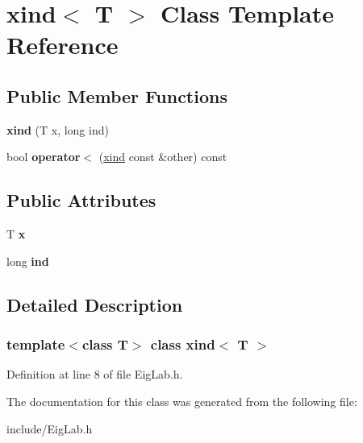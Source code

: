 \hypertarget{classxind}{}\section{xind$<$ T $>$ Class Template Reference}
\label{classxind}
\subsection*{Public Member Functions}
\begin{DoxyCompactItemize}
\item 
\mbox{\label{classxind_a03541f9baa82fbd0c237678ab9e64f93}} 
{\bfseries xind} (T x, long ind)
\item 
\mbox{\label{classxind_a98331d26bf395e5e2c7df29eb7d61f97}} 
bool {\bfseries operator$<$} (\mbox{\hyperlink{classxind}{xind}} const \&other) const
\end{DoxyCompactItemize}
\subsection*{Public Attributes}
\begin{DoxyCompactItemize}
\item 
\mbox{\label{classxind_a00fdccd018f160800da21a8396c64ba4}} 
T {\bfseries x}
\item 
\mbox{\label{classxind_aa04e6ef061b2ea406bd5c3b22d50261e}} 
long {\bfseries ind}
\end{DoxyCompactItemize}


\subsection{Detailed Description}
\subsubsection*{template$<$class T$>$\newline
class xind$<$ T $>$}



Definition at line 8 of file Eig\+Lab.\+h.



The documentation for this class was generated from the following file\+:\begin{DoxyCompactItemize}
\item 
include/Eig\+Lab.\+h\end{DoxyCompactItemize}
